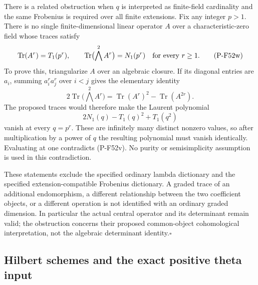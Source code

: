 \documentclass[11pt,a4paper]{article}
\begin{document}
There is a related obstruction when $q$ is interpreted as
finite-field cardinality and the same Frobenius is required
over all finite extensions. Fix any integer $p>1$. There is
no single finite-dimensional linear operator $A$ over a
characteristic-zero field whose traces satisfy
\[
 \operatorname{Tr}(A^r)=T_1(p^r),\qquad
 \operatorname{Tr}\bigl(\bigwedge^2 A^r\bigr)=N_1(p^r)
                   \quad\hbox{for every }r\ge1.
                                                        \tag{P-F52w}
\]
To prove this, triangularize $A$ over an algebraic closure.
If its diagonal entries are $a_i$, summing
$a_i^r a_j^r$ over $i<j$ gives the elementary identity
\[
 2\operatorname{Tr}\bigl(\bigwedge^2 A^r\bigr)
       =\operatorname{Tr}(A^r)^2-\operatorname{Tr}(A^{2r}).
\]
The proposed traces would therefore make the Laurent
polynomial
\[
       2N_1(q)-T_1(q)^2+T_1(q^2)
                                                        \tag{P-F52x}
\]
vanish at every $q=p^r$. These are infinitely many distinct
nonzero values, so after multiplication by a power of $q$
the resulting polynomial must vanish identically. Evaluating
at one contradicts (P-F52v). No purity or semisimplicity
assumption is used in this contradiction.

These statements exclude the specified ordinary lambda
dictionary and the specified extension-compatible Frobenius
dictionary. A graded trace of an additional endomorphism,
a different relationship between the two coefficient objects,
or a different operation is not identified with an ordinary
graded dimension. In particular the actual central operator
and its determinant remain valid; the obstruction concerns
their proposed common-object cohomological interpretation,
not the algebraic determinant identity.\hfill$\square$


\subsection{Hilbert schemes and the exact positive theta input}
\end{document}
